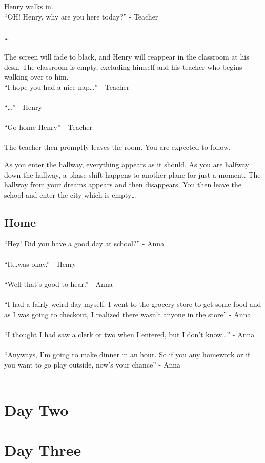 \documentclass[12pt, a4paper, titlepage]{article}
\begin{document}
           Henry walks in.\\
 
           ``OH! Henry, why are you here today?'' - Teacher\\~\\
           \ldots\\~\\
           
           The screen will fade to black, and Henry will reappear in the classroom at his desk. The classroom is empty, 
           excluding himself and his teacher who begins walking over to him.\\
           
           ``I hope you had a nice nap\ldots'' - Teacher\\~\\
           ``\ldots'' - Henry\\~\\
           ``Go home Henry'' - Teacher\\~\\
           
           The teacher then promptly leaves the room. You are expected to follow.
           
           As you enter the hallway, everything appears as it should. As you are halfway down the hallway, a phase shift happens to another plane for just a moment. The hallway from your 		dreams appears and then disappears. You then leave the school and enter the city which is empty\ldots

        \subsection{Home}

            ``Hey! Did you have a good day at school?'' - Anna\\~\\
            ``It\dots was okay.'' - Henry\\~\\
            ``Well that's good to hear.'' - Anna\\~\\
            ``I had a fairly weird day myself. I went to the grocery store to get some food and as I was going to checkout, I realized there wasn't anyone in the store'' - Anna\\~\\
            ``I thought I had saw a clerk or two when I entered, but I don't know\ldots'' - Anna\\~\\
            ``Anyways, I'm going to make dinner in an hour. So if you any homework or if you want to go play outside, now's your chance'' - Anna\\~\\

            
    \section{Day Two}
    
    \section{Day Three}
\end{document}
